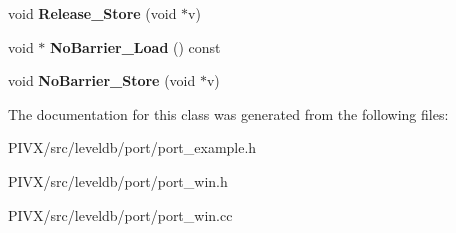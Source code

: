 \begin{DoxyCompactItemize}
\item 
\mbox{\label{classleveldb_1_1port_1_1_atomic_pointer_a8dfe51c125f71c09a363dae042be63a7}} 
void {\bfseries Release\+\_\+\+Store} (void $\ast$v)
\item 
\mbox{\label{classleveldb_1_1port_1_1_atomic_pointer_a615de2ac1a6d373986639f662a8bc2bd}} 
void $\ast$ {\bfseries No\+Barrier\+\_\+\+Load} () const
\item 
\mbox{\label{classleveldb_1_1port_1_1_atomic_pointer_aa7faab23777d1fe3c1a96d32a28ed20c}} 
void {\bfseries No\+Barrier\+\_\+\+Store} (void $\ast$v)
\end{DoxyCompactItemize}


The documentation for this class was generated from the following files\+:\begin{DoxyCompactItemize}
\item 
P\+I\+V\+X/src/leveldb/port/port\+\_\+example.\+h\item 
P\+I\+V\+X/src/leveldb/port/port\+\_\+win.\+h\item 
P\+I\+V\+X/src/leveldb/port/port\+\_\+win.\+cc\end{DoxyCompactItemize}
